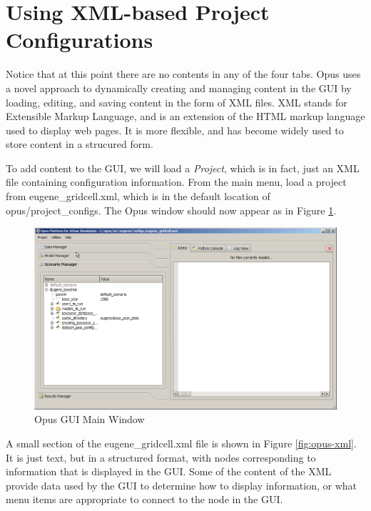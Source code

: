 \section{Using XML-based Project Configurations}
\label{chap:using-xml-based-project-configurations}

Notice that at this point there are no contents in any of the four tabs.  Opus uses a novel approach to dynamically creating and managing content in the GUI by loading, editing, and saving content in the form of XML files.  XML stands for Extensible Markup Language, and is an extension of the HTML markup language used to display web pages.  It is more flexible, and has become widely used to store content in a strucured form.  

To add content to the GUI, we will load a \emph{Project}, which is in fact, just an XML file containing configuration information.  From the main menu, load a project from eugene\_gridcell.xml, which is in the default location of opus/project\_configs.  The Opus window should now appear as in Figure \ref{fig:opus2}.

\begin{figure}[htp]
\begin{center}
\includegraphics[scale=0.4]{graphics/opus2.png}
\end{center}
\caption{Opus GUI Main Window}
\label{fig:opus2}
\end{figure}

A small section of the eugene\_gridcell.xml file is shown in Figure \ref{fig:opus-xml}.  It is just text, but in a structured format, with nodes corresponding to information that is displayed in the GUI.  Some of the content of the XML provide data used by the GUI to determine how to display information, or what menu items are appropriate to connect to the node in the GUI.

